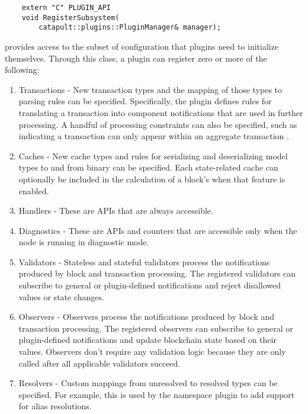 \begin{lstlisting}
	extern "C" PLUGIN_API
	void RegisterSubsystem(
		catapult::plugins::PluginManager& manager);
\end{lstlisting}

 provides access to the subset of configuration that plugins need to initialize themselves.
Through this class, a plugin can register zero or more of the following:

\begin{enumerate}
	\item{Transactions -
		New transaction types and the mapping of those types to parsing rules can be specified.
		Specifically, the plugin defines rules for translating a transaction into component notifications that are used in further processing.
		A handful of processing constraints can also be specified, such as indicating a transaction can only appear within an aggregate transaction .
	}
	\item{Caches -
		New cache types and rules for serializing and deserializing model types to and from binary can be specified.
		Each state-related cache can optionally be included in the calculation of a block's   when that feature is enabled.
	}
	\item{Handlers - These are APIs that are always accessible.}
	\item{Diagnostics - These are APIs and counters that are accessible only when the node is running in diagnostic mode.}
	\item{Validators -
		Stateless and stateful validators process the notifications produced by block and transaction processing.
		The registered validators can subscribe to general or plugin-defined notifications and reject disallowed values or state changes.
	}
	\item{Observers -
		Observers process the notifications produced by block and transaction processing.
		The registered observers can subscribe to general or plugin-defined notifications and update blockchain state based on their values.
		Observers don't require any validation logic because they are only called after all applicable validators succeed.
	}
	\item{Resolvers -
		Custom mappings from unresolved to resolved types can be specified.
		For example, this is used by the namespace plugin to add support for alias resolutions.
	}
\end{enumerate}

